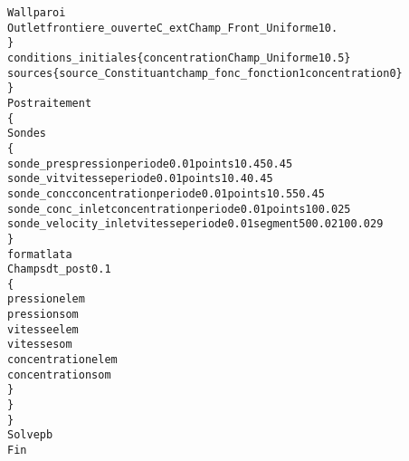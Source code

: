 \begin{alltt}
            Wall    paroi
            Outlet  frontiere_ouverte C_ext Champ_Front_Uniforme 1 0.
        \}
        conditions_initiales \{ concentration Champ_Uniforme 1 0.5 \}
        sources \{ source_Constituant champ_fonc_fonction 1 concentration 0 \}
    \}
    Postraitement
    \{
        Sondes
        \{
            sonde_pres pression periode 0.01 points 1 0.45 0.45
            sonde_vit  vitesse periode 0.01 points 1 0.4 0.45
            sonde_conc concentration periode 0.01 points 1 0.55 0.45
            sonde_conc_inlet     concentration periode 0.01 points 1 0 0.025
            sonde_velocity_inlet vitesse periode 0.01 segment 5 0 0.021 0 0.029
        \}
        format lata
        Champs dt_post 0.1
        \{
            pression elem
            pression som
            vitesse elem
            vitesse som
            concentration elem
            concentration som
        \}
    \}
\}
Solve pb
Fin
\end{alltt}
